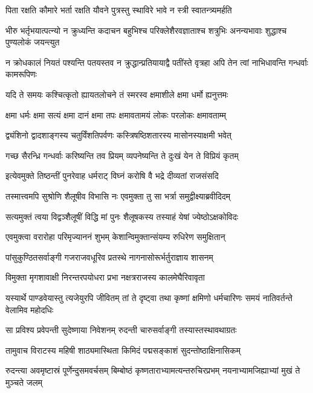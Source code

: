 \twolineshloka
{पिता रक्षति कौमारे भर्ता रक्षति यौवने}
{पुत्रस्तु स्थाविरे भावे न स्त्री स्वातन्त्र्यमर्हति}


\threelineshloka
{भीरु भर्तृभयात्पत्न्यो न क्रुध्यन्ति कदाचन}
{बहुभिश्च परिक्लेशैरवज्ञाताश्च शत्रुभिः}
{अनन्यभावाः शुद्धाश्च पुण्यलोकं जयन्त्युत}


\threelineshloka
{न क्रोधकालं नियतं पश्यन्ति पतयस्तव}
{न क्रुद्धान्प्रतियायाद्वै पतींस्ते वृत्रहा अपि}
{तेन त्वां नाभिधावन्ति गन्धर्वाः कामरूपिणः}


\twolineshloka
{यदि ते समयः कश्चित्कृतो ह्यायतलोचने}
{तं स्मरस्व क्षमाशीले क्षमा धर्मो ह्यनुत्तमः}


\twolineshloka
{क्षमा धर्मः क्षमा सत्यं क्षमा दानं क्षमा तपः}
{क्षमावतामयं लोकः परलोकः क्षमावताम्म्}


\twolineshloka
{द्व्यंशिनो द्वादशाङ्गस्य चतुर्विंशतिपर्वणः}
{कस्त्रिषष्ठिशतारस्य मासोनस्याक्षमी भवेत्}


\twolineshloka
{गच्छ सैरन्ध्रि गन्धर्वाः करिष्यन्ति तव प्रियम्}
{व्यपनेष्यन्ति ते दुःखं येन ते विप्रियं कृतम्}


\twolineshloka
{इत्येवमुक्ते तिष्ठन्तीं पुनरेवाह धर्मराट्}
{विघ्नं करोषि वै भद्रे दीव्यतां राजसंसदि}


\twolineshloka
{तस्मात्त्वमपि सुश्रोणि शैलूषीव विभासि नः}
{एवमुक्ता तु सा भर्त्रा समुद्वीक्ष्याब्रवीदिदम्}


\twolineshloka
{सत्यमुक्तं त्वया विद्वञ्शैलूषीं विद्धि मां पुनः}
{शैलूषकस्य तस्याहं येषां ज्येष्ठोऽक्षकोविदः}


\twolineshloka
{एवमुक्त्वा वरारोहा परिमृज्याननं शुभम्}
{केशान्विमुक्तान्संयम्य रुधिरेण समुक्षितान्}





\twolineshloka
{पांसुकुण्ठितसर्वाङ्गी गजराजवधूरिव}
{प्रतस्थे नागनासोरूर्भर्तुराज्ञाय शासनम्}


\twolineshloka
{विमुक्ता मृगशावाक्षी निरन्तरपयोधरा}
{प्रभा नक्षत्रराजस्य कालमेघैरिवावृता}


\threelineshloka
{यस्यार्थे पाण्डवेयास्तु त्यजेयुरपि जीवितम्}
{तां ते दृष्ट्वा तथा कृष्णां क्षमिणो धर्मचारिणः}
{समयं नातिवर्तन्ते वेलामिव महोदधिः}


\twolineshloka
{सा प्रविश्य प्रवेपन्ती सुदेष्णाया निवेशनम्}
{रुदन्ती चारुसर्वाङ्गी तस्यास्तस्थावथाग्रतः}


\twolineshloka
{तामुवाच विराटस्य महिषी शाठ्यमास्थिता}
{किमिदं पद्मसङ्काशं सुदन्तोष्ठाक्षिनासिकम्}


\threelineshloka
{रुदन्त्या अवमृष्टास्रं पूर्णेन्दुसमवर्चसम्}
{बिम्बोष्ठं कृष्णताराभ्यामत्यन्तरुचिरप्रभम्}
{नयनाभ्यामजिह्याभ्यां मुखं ते मुञ्चते जलम्}


